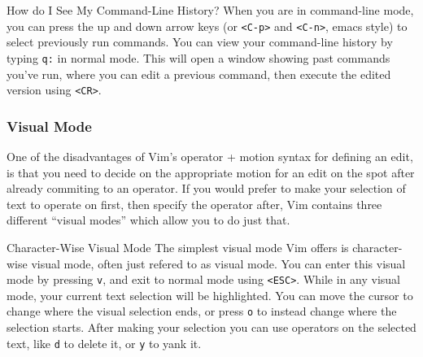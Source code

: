 \documentclass{beamer}
\begin{document}
\begin{frame}[fragile]
    \begin{block}{How do I See My Command-Line History?}
	When you are in command-line mode, you can press the up and down arrow keys (or \verb+<C-p>+ and \verb+<C-n>+, emacs style) to select previously run commands. You can view your command-line history by typing \verb+q:+ in normal mode. This will open a window showing past commands you've run, where you can edit a previous command, then execute the edited version using \verb+<CR>+.
    \end{block}
\end{frame}

\begin{frame}[fragile]
    \frametitle{Visual Mode}
    One of the disadvantages of Vim's operator + motion syntax for defining an edit, is that you need to decide on the appropriate motion for an edit on the spot after already commiting to an operator. If you would prefer to make your selection of text to operate on first, then specify the operator after, Vim contains three different \enquote{visual modes} which allow you to do just that.
    \begin{block}{Character-Wise Visual Mode}
	The simplest visual mode Vim offers is character-wise visual mode, often just refered to as visual mode. You can enter this visual mode by pressing \verb+v+, and exit to normal mode using \verb+<ESC>+. While in any visual mode, your current text selection will be highlighted. You can move the cursor to change where the visual selection ends, or press \verb+o+ to instead change where the selection starts. After making your selection you can use operators on the selected text, like \verb+d+ to delete it, or \verb+y+ to yank it.
    \end{block}
\end{frame}
\end{document}
